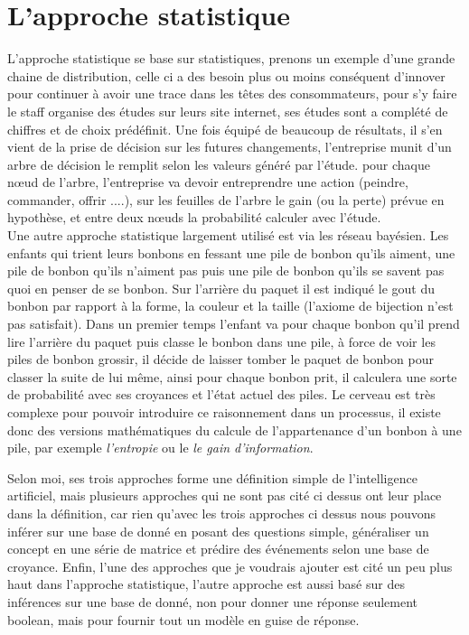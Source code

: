 \section{L'approche statistique}

L'approche statistique se base sur statistiques, prenons un exemple d'une grande chaine de distribution, celle ci a des besoin plus ou moins conséquent d'innover pour continuer à avoir une trace dans les têtes des consommateurs, pour s'y faire le staff organise des études sur leurs site internet, ses études sont a complété de chiffres et de choix prédéfinit. Une fois équipé de beaucoup de résultats, il s'en vient de la prise de décision sur les futures changements, l'entreprise munit d'un arbre de décision le remplit selon les valeurs généré par l'étude. pour chaque nœud de l'arbre, l'entreprise va devoir entreprendre une action (peindre, commander, offrir ....), sur les feuilles de l'arbre le gain (ou la perte) prévue en hypothèse, et entre deux nœuds la probabilité calculer avec l'étude.\\
\linebreak
Une autre approche statistique largement utilisé est via les réseau bayésien. Les enfants qui trient leurs bonbons en fessant une pile de bonbon qu'ils aiment, une pile de bonbon qu'ils n'aiment pas puis une pile de bonbon qu'ils se savent pas quoi en penser de se bonbon. Sur l'arrière du paquet il est indiqué le gout du bonbon par rapport à la forme, la couleur et la taille (l'axiome de bijection n'est pas satisfait). Dans un premier temps l'enfant va pour chaque bonbon qu'il prend lire l'arrière du paquet puis classe le bonbon dans une pile, à force de voir les piles de bonbon grossir, il décide de laisser tomber le paquet de bonbon pour classer la suite de lui même, ainsi pour chaque bonbon prit, il calculera une sorte de probabilité avec ses croyances et l'état actuel des piles. Le cerveau est très complexe pour pouvoir introduire ce raisonnement dans un processus, il existe donc des versions mathématiques du calcule de l'appartenance d'un bonbon à une pile, par exemple \textit{l'entropie} ou le \textit{le gain d'information}.\\

\pagebreak

Selon moi, ses trois approches forme une définition simple de l'intelligence artificiel, mais plusieurs approches qui ne sont pas cité ci dessus ont leur place dans la définition, car rien qu'avec les trois approches ci dessus nous pouvons inférer sur une base de donné en posant des questions simple, généraliser un concept en une série de matrice et prédire des événements selon une base de croyance. Enfin, l'une des approches que je voudrais ajouter est cité un peu plus haut dans l'approche statistique, l'autre approche est aussi basé sur des inférences sur une base de donné, non pour donner une réponse seulement boolean, mais pour fournir tout un modèle en guise de réponse.

